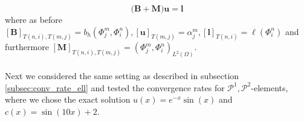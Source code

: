 \begin{equation}
	\label{eq:elliptic_matrix_vect_system_with_mass}
	\Big( \textbf{B} + \textbf{M} \Big) \textbf{u} = \textbf{l}
\end{equation}
where as before 
$ [\textbf{B}]_{T(n,i), T(m,j)} = b_h(\Phi_j^m, \Phi_i^n),
	[\textbf{u}]_{T(m,j)} = \alpha_j^m,
	[\textbf{l}]_{T(n,i)} = \ell(\Phi_i^n)$ and furthermore
$ [\textbf{M}]_{T(n,i), T(m,j)} = (\Phi_j^m, \Phi_i^n)_{L^2(\Omega)}$.
\\ \\
Next we considered the same setting as described in subsection \ref{subsec:conv_rate_ell} and tested the convergence rates for $\mathcal{P}^1,\mathcal{P}^2$-elements,
where we chose the exact solution $u(x) = e^{-x}\sin(x)$ and $c(x) = \sin(10x) + 2$.

\begin{figure}[h!]
    \centering
    

\end{figure}
